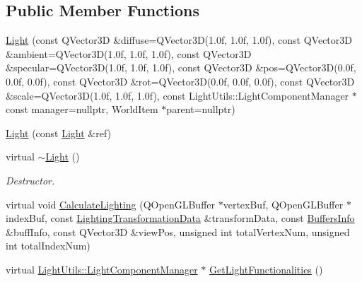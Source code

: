 \subsection*{Public Member Functions}
\begin{DoxyCompactItemize}
\item 
\mbox{\hyperlink{class_geometry_engine_1_1_geometry_world_item_1_1_geometry_light_1_1_light_ad21bcb5a229e8bb799d2bba5462a2604}{Light}} (const Q\+Vector3D \&diffuse=Q\+Vector3D(1.\+0f, 1.\+0f, 1.\+0f), const Q\+Vector3\+D \&ambient=\+Q\+Vector3\+D(1.\+0f, 1.\+0f, 1.\+0f), const Q\+Vector3\+D \&specular=\+Q\+Vector3\+D(1.\+0f, 1.\+0f, 1.\+0f), const Q\+Vector3\+D \&pos=\+Q\+Vector3\+D(0.\+0f, 0.\+0f, 0.\+0f), const Q\+Vector3\+D \&rot=\+Q\+Vector3\+D(0.\+0f, 0.\+0f, 0.\+0f), const Q\+Vector3\+D \&scale=\+Q\+Vector3\+D(1.\+0f, 1.\+0f, 1.\+0f), const Light\+Utils\+::\+Light\+Component\+Manager $\ast$const manager=nullptr, World\+Item $\ast$parent=nullptr)
\item 
\mbox{\hyperlink{class_geometry_engine_1_1_geometry_world_item_1_1_geometry_light_1_1_light_a057f30d881c04f30fefa313c98902e34}{Light}} (const \mbox{\hyperlink{class_geometry_engine_1_1_geometry_world_item_1_1_geometry_light_1_1_light}{Light}} \&ref)
\item 
\mbox{\label{class_geometry_engine_1_1_geometry_world_item_1_1_geometry_light_1_1_light_af87a5bfe23c9ccf5c84d42e5ac4af0f7}} 
virtual \mbox{\hyperlink{class_geometry_engine_1_1_geometry_world_item_1_1_geometry_light_1_1_light_af87a5bfe23c9ccf5c84d42e5ac4af0f7}{$\sim$\+Light}} ()
\begin{DoxyCompactList}\small\item\em Destructor. \end{DoxyCompactList}\item 
virtual void \mbox{\hyperlink{class_geometry_engine_1_1_geometry_world_item_1_1_geometry_light_1_1_light_abffc2b2ce5240b3c21b51020488dba10}{Calculate\+Lighting}} (Q\+Open\+G\+L\+Buffer $\ast$vertex\+Buf, Q\+Open\+G\+L\+Buffer $\ast$index\+Buf, const \mbox{\hyperlink{class_geometry_engine_1_1_lighting_transformation_data}{Lighting\+Transformation\+Data}} \&transform\+Data, const \mbox{\hyperlink{class_geometry_engine_1_1_buffers_info}{Buffers\+Info}} \&buff\+Info, const Q\+Vector3D \&view\+Pos, unsigned int total\+Vertex\+Num, unsigned int total\+Index\+Num)
\item 
virtual \mbox{\hyperlink{class_geometry_engine_1_1_light_utils_1_1_light_component_manager}{Light\+Utils\+::\+Light\+Component\+Manager}} $\ast$ \mbox{\hyperlink{class_geometry_engine_1_1_geometry_world_item_1_1_geometry_light_1_1_light_a019f1a8457a883454d9c9d4272f7a1d5}{Get\+Light\+Functionalities}} ()

\end{DoxyCompactItemize}
